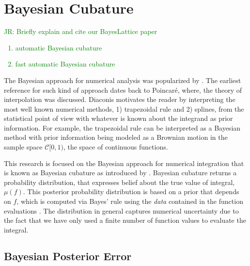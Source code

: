 \documentclass{svjour3}                     %
\newcommand{\JRNote}[1]{{\textcolor{green}{JR: #1}}}
\begin{document}


\section{Bayesian Cubature}
\label{sec:BC} 

\JRNote{
Briefly explain and cite our BayesLattice paper
\begin{enumerate}
	\item automatic Bayesian cubature
	\item fast automatic Bayesian cubature
\end{enumerate}
}



The Bayesian approach for numerical analysis was popularized by 
\cite{Dia88a}. The earliest reference for such kind of approach dates back to Poincar\'e, where, the theory of interpolation was discussed.
Diaconis motivates the reader by interpreting the most well known numerical methods, 1) trapezoidal rule and 2) splines, from the statistical point of view with whatever is known about the integrand as prior information. 
For example, the trapezoidal rule can be interpreted as a Bayesian method with prior information being modeled as a Brownian motion in the sample space $\mathcal{C}[0,1)$, the space of continuous functions. %

This research is focused on the Bayesian approach for numerical integration that is known as Bayesian cubature as introduced by \cite{OHagen1991}.  %
Bayesian cubature returns a probability distribution, that expresses belief about the true value of integral, $\mu(f)$.
This posterior probability distribution is based on a prior that depends on $f$, which is computed via Bayes' rule using the \emph{data} contained in the function evaluations \cite{BriEtal18a}. 
The distribution in general captures numerical uncertainty due to the fact that we have only used a finite number of function values to evaluate the integral.

\subsection{Bayesian Posterior Error}
\label{sec:BayesPostErr}
\end{document}
